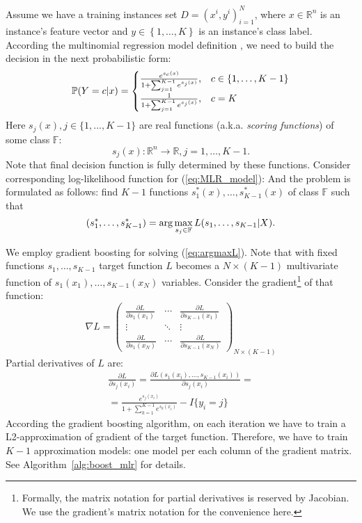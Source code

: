 \documentclass{article}
\begin{document}
Assume we have a training instances set $D={(x^i, y^i)}_{i=1}^N$,  where $x\in\mathbb{R}^n$ is an instance's feature vector
and $y\in\left\{ 1,\dots,K\right\} $ is an instance's class label. According the multinomial regression model definition \cite{GLM}, we need to build the decision in the next probabilistic form:
\begin{equation}
	\mathbb{P}(Y = c \arrowvert x) =
	\begin{cases}
		\frac{ e^{s_{c}(x)} }
			 { 1+\sum_{j=1}^{K-1} e^{s_{j}(x)} }
		, & c \in \{1, \ldots, K-1 \} \\

		\frac{ 1 }
			 { 1 + \sum_{j=1}^{K-1} e^{s_{j}(x)} }
		, & c=K
	\end{cases}\label{eq:MLR_model}
\end{equation}
Here $s_{j}(x), j \in \{ 1, \ldots, K-1 \}$ are real functions (a.k.a. \textit{scoring functions}) of some class $\mathbb{F}$:
\[
	s_{j}(x): \mathbb{R}^{n} \rightarrow \mathbb{R}, j=1, \dots, K-1.
\]
Note that final decision function is fully determined by these functions.
Consider corresponding log-likelihood function for (\ref{eq:MLR_model}):
And the problem is formulated as follows: find $K-1$ functions $s_{1}^{*}(x),\dots,s_{K-1}^{*}(x)$ of class $\mathbb{F}$ such that
\begin{equation}
(s_{1}^{*}, \dots, s_{K-1}^{*}) = \arg\max_{s_{j} \in \mathbb{F}} L(s_{1},\dots,s_{K-1}\arrowvert X).\label{eq:argmaxL}
\end{equation}

We employ gradient boosting for solving (\ref{eq:argmaxL}).
Note that with fixed functions $s_1,\ldots,s_{K-1}$ target function $L$ becomes a $N\times(K-1)$ multivariate function of $s_1(x_1),\ldots,s_{K-1}(x_N)$ variables. Consider the gradient\footnote{Formally, the matrix notation for partial derivatives is reserved by Jacobian. We use the gradient's matrix notation for the convenience here.} of that function:
\[
\nabla L = 
\left(
\begin{array}{ccc}
	  \frac{ \partial L }{ \partial s_{1}(x_{1}) } 
	& \cdots 
	& \frac{ \partial L }{ \partial s_{K-1}(x_{1}) } \\

	  \vdots & \ddots & \vdots\\

	  \frac{ \partial L }{ \partial s_{1}(x_{N}) } 
	& \cdots 
	& \frac{ \partial L }{ \partial s_{K-1}(x_{N}) }
\end{array}
\right)_{N \times (K-1)}
\]
Partial derivatives of $L$ are:
\begin{multline}
\frac{ \partial L }{ \partial s_{j}(x_{i}) }=
\frac{ \partial L(s_{1}(x_{i}),\dots,s_{K-1}(x_{i})) }{ \partial s_{j}(x_{i}) }= \\ =
\frac{ e^{s_{j}(x_{i})} }{ 1+\sum_{k=1}^{K-1} e^{s_{k}(x_{i})} } - I\{y_{i} = j\} \label{eq:partial_L}
\end{multline}
According the gradient boosting algorithm, on each iteration we have to train a L2-approximation of gradient of the target function. Therefore, we have to train $K-1$ approximation models: one  model per each column of the gradient matrix. See Algorithm~\ref{alg:boost_mlr} for details.
\end{document}
